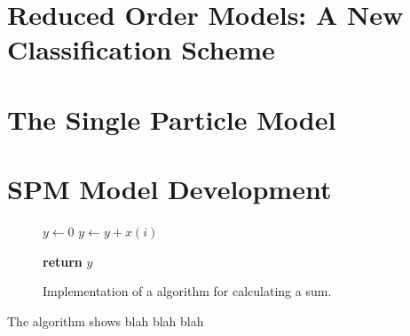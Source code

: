 



\graphicspath{{4/figures/}}

\section{Reduced Order Models: A New Classification Scheme}\label{sec:classificationscheme}


\section{The Single Particle Model}


\section{\gls{SPM} Model Development}\label{sec:spmmodeldevelopment}


\begin{figure}[htb]
    \begin{algorithmic}[1]


        \State $y\gets0$
         
        \State $y\gets y+x(i)$ 
        \EndFor

        \State \textbf{return}  $y$
        \EndProcedure
    \end{algorithmic}
    \caption[Implementation of a algorithm for calculating a sum.]{Implementation of a algorithm for calculating a sum.}
    \label{fig:algorithm1}
\end{figure}

The  algorithm shows blah blah blah


